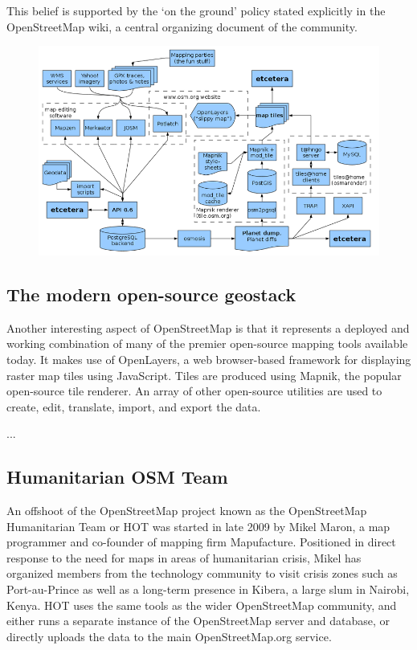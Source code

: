 \documentclass[11pt]{report}
\begin{document}
This belief is supported by the `on the ground' policy stated explicitly in the OpenStreetMap wiki, a central organizing document of the community.

\begin{figure}[h]
  \begin{center}
    \includegraphics[scale=0.45]{images/osm-diagram.png}
  \end{center}
\end{figure}

\subsection{The modern open-source geostack}

Another interesting aspect of OpenStreetMap is that it represents a deployed and working combination of many of the premier open-source mapping tools available today. It makes use of OpenLayers, a web browser-based framework for displaying raster map tiles using JavaScript. Tiles are produced using Mapnik, the popular open-source tile renderer. An array of other open-source utilities are used to create, edit, translate, import, and export the data. 

...

\subsection{Humanitarian OSM Team}
 
An offshoot of the OpenStreetMap project known as the OpenStreetMap Humanitarian Team or HOT was started in late 2009 by Mikel Maron, a map programmer and co-founder of mapping firm Mapufacture. Positioned in direct response to the need for maps in areas of humanitarian crisis, Mikel has organized members from the technology community to visit crisis zones such as Port-au-Prince as well as a long-term presence in Kibera, a large slum in Nairobi, Kenya. HOT uses the same tools as the wider OpenStreetMap community, and either runs a separate instance of the OpenStreetMap server and database, or directly uploads the data to the main OpenStreetMap.org service. 
\end{document}
